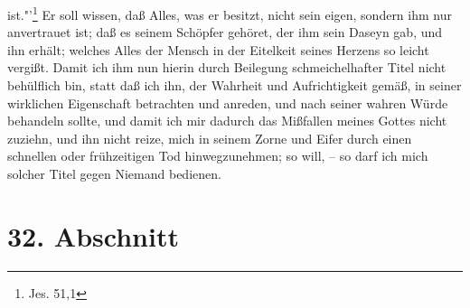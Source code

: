 ist."'\footnote{Jes. 51,1} Er soll wissen, daß Alles, was er besitzt, nicht sein
eigen, sondern ihm nur anvertrauet ist; daß es seinem Schöpfer gehöret, der ihm
sein Daseyn gab, und ihn erhält; welches Alles der Mensch in der Eitelkeit
seines Herzens so leicht vergißt. Damit ich ihm nun hierin durch Beilegung
schmeichelhafter Titel nicht behülflich bin, statt daß ich ihn, der Wahrheit und
Aufrichtigkeit gemäß, in seiner wirklichen Eigenschaft betrachten und anreden,
und nach seiner wahren Würde behandeln sollte, und damit ich mir dadurch das
Mißfallen meines Gottes nicht zuziehn, und ihn nicht reize, mich in seinem Zorne
und Eifer durch einen schnellen oder frühzeitigen Tod hinwegzunehmen; so will,
-- so darf ich mich solcher Titel gegen Niemand bedienen.

\section{32. Abschnitt} \label{kap9_ab32}

